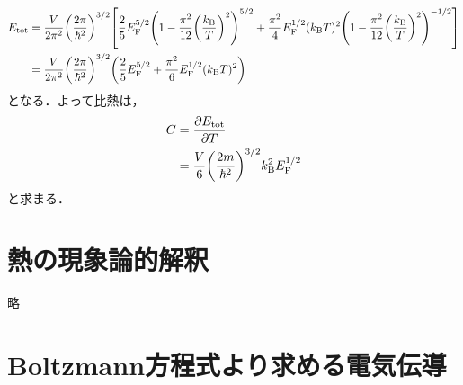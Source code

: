 \documentclass{report}
\begin{document}
        \begin{align}
          E_{\mathrm{tot}} &= \frac{V}{2\pi^2}\qty(\frac{2\pi}{\hbar^2})^{3/2}\qty[\frac{2}{5}E_{\mathrm{F}}^{5/2}\qty(1 - \frac{\pi^2}{12}\qty(\frac{k_{\mathrm{B}}}{T})^2)^{5/2} + \frac{\pi^2}{4}E_{\mathrm{F}}^{1/2}(k_{\mathrm{B}} T)^2\qty(1 - \frac{\pi^2}{12}\qty(\frac{k_{\mathrm{B}}}{T})^2)^{-1/2}] \\ 
          &= \frac{V}{2\pi^2}\qty(\frac{2\pi}{\hbar^2})^{3/2}\qty(\frac{2}{5}E_{\mathrm{F}}^{5/2} + \frac{\pi^2}{6}E_{\mathrm{F}}^{1/2}(k_{\mathrm{B}} T)^2) \label{electron-energy-8}
        \end{align}
        となる．よって比熱は，
        \begin{align}
          C &= \pdv{E_{\mathrm{tot}}}{T} \\
          &= \frac{V}{6}\qty(\frac{2m}{\hbar^2})^{3/2}k_{\mathrm{B}}^2 E_{\mathrm{F}}^{1/2}
        \end{align}
        と求まる．
  \chapter{熱の現象論的解釈}
    略
  \chapter{Boltzmann方程式より求める電気伝導}
\end{document}
